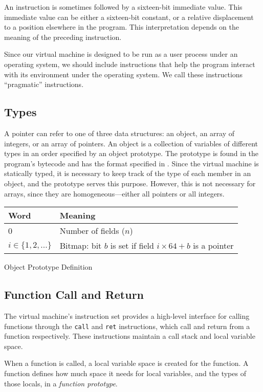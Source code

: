 		An instruction is sometimes followed by a sixteen-bit immediate value. This immediate value can be either a sixteen-bit constant, or a relative displacement to a position elsewhere in the program. This interpretation depends on the meaning of the preceding instruction.
		
		Since our virtual machine is designed to be run as a user process under an operating system, we should include instructions that help the program interact with its environment under the operating system. We call these instructions ``pragmatic'' instructions.
		
		\subsection{Types}
		A pointer can refer to one of three data structures: an object, an array of integers, or an array of pointers. An object is a collection of variables of different types in an order specified by an object prototype. The prototype is found in the program's bytecode and has the format specified in . Since the virtual machine is statically typed, it is necessary to keep track of the type of each member in an object, and the prototype serves this purpose. However, this is not necessary for arrays, since they are homogeneous---either all pointers or all integers.
		
		\begin{myfigure}
			\begin{tabular}{|l|l| }
				\hline
				Word & Meaning \\
				\hline
				0 & Number of fields ($n$) \\
				\hline
				$i \in \{1, 2, ...\}$ & Bitmap: bit $b$ is set if field $i\times64 + b$ is a pointer \\
				\hline
			\end{tabular}
			\caption{Object Prototype Definition}
			\label{fig:objproto}
		\end{myfigure}
		
		\subsection{Function Call and Return}
		The virtual machine's instruction set provides a high-level interface for calling functions through the \texttt{call} and \texttt{ret} instructions, which call and return from a function respectively. These instructions maintain a call stack and local variable space.
		
		When a function is called, a local variable space is created for the function. A function defines how much space it needs for local variables, and the types of those locals, in a \emph{function prototype}. 
		

